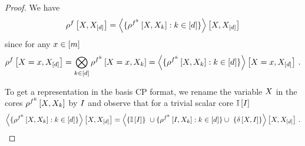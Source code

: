 \begin{proof}
	
	We have 
	\begin{align*}
		\rho^{f}\left[X,X_{[d]}\right]  
		= \left\langle 
		\{\rho^{f^{k}}\left[X,X_{k}\right] : k\in[d] \} 
		\right\rangle \left[ X,X_{[d]} \right]
	\end{align*}
	since for any $x\in[m]$ 
	\begin{align*}
		\rho^{f}\left[X=x,X_{[d]}\right]  
		= \bigotimes_{k\in[d]} \rho^{f^{k}}\left[X=x,X_{k}\right]
		= \left\langle 
		\{\rho^{f^{k}}\left[X,X_{k}\right] : k\in[d] \} 
		\right\rangle \left[ X=x,X_{[d]} \right] \, . 
	\end{align*}
	
	To get a representation in the basis CP format, we rename the variable $X$ in the cores $\rho^{f^{k}}\left[X,X_{k}\right]$ by $I$ and observe that for a trivial scalar core $\mathbb{I}\left[I\right]$ 
	\begin{align*}
		\contractionof{
		\{\rencodingofat{\exfunction^{\atomenumerator}}{\catvariable,\catvariableof{\atomenumerator}} : \atomenumeratorin \} 
		}{\catvariable,\shortcatvariables} 
		=
		\contractionof{ 
		\{\onesat{\decvariable}\} \cup \{\rencodingofat{\exfunction^{\atomenumerator}}{\decvariable,\catvariableof{\atomenumerator}} : \atomenumeratorin \} \cup \{\identityat{\catvariable,\decvariable}\}
		}{\catvariable,\shortcatvariables}  \, . 
	\end{align*}
	
\end{proof}





